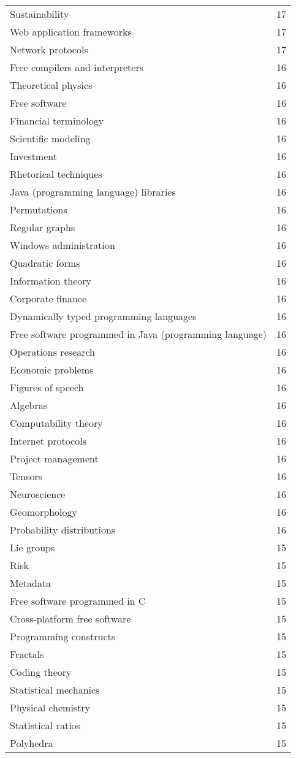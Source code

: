 \begin{appendices}
\begin{longtable} {|| p{20em} | p{5em} ||}
Sustainability	&	17	\\
Web application frameworks	&	17	\\
Network protocols	&	17	\\
Free compilers and interpreters	&	16	\\
Theoretical physics	&	16	\\
Free software	&	16	\\
Financial terminology	&	16	\\
Scientific modeling	&	16	\\
Investment	&	16	\\
Rhetorical techniques	&	16	\\
Java (programming language) libraries	&	16	\\
Permutations	&	16	\\
Regular graphs	&	16	\\
Windows administration	&	16	\\
Quadratic forms	&	16	\\
Information theory	&	16	\\
Corporate finance	&	16	\\
Dynamically typed programming languages	&	16	\\
Free software programmed in Java (programming language)	&	16	\\
Operations research	&	16	\\
Economic problems	&	16	\\
Figures of speech	&	16	\\
Algebras	&	16	\\
Computability theory	&	16	\\
Internet protocols	&	16	\\
Project management	&	16	\\
Tensors	&	16	\\
Neuroscience	&	16	\\
Geomorphology	&	16	\\
Probability distributions	&	16	\\
Lie groups	&	15	\\
Risk	&	15	\\
Metadata	&	15	\\
Free software programmed in C	&	15	\\
Cross-platform free software	&	15	\\
Programming constructs	&	15	\\
Fractals	&	15	\\
Coding theory	&	15	\\
Statistical mechanics	&	15	\\
Physical chemistry	&	15	\\
Statistical ratios	&	15	\\
Polyhedra	&	15	\\
 

\end{longtable}
\end{appendices}
